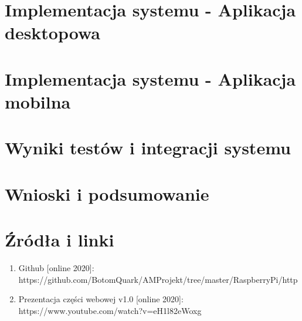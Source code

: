 \documentclass{article}
\begin{document}
	\section{Implementacja systemu - Aplikacja desktopowa}
	\section{Implementacja systemu - Aplikacja mobilna}
	\section{Wyniki testów i integracji systemu}
	\section{Wnioski i podsumowanie}
	\section{Źródła i linki}
		\label{source}
		\begin{enumerate}
			\item Github [online 2020]: https://github.com/BotomQuark/AMProjekt/tree/master/RaspberryPi/http
			\item Prezentacja części webowej v1.0 [online 2020]: https://www.youtube.com/watch?v=eH1l82eWoxg
		\end{enumerate}
\end{document}
